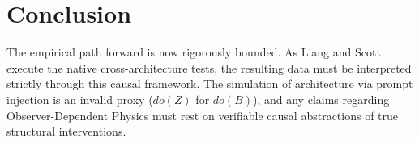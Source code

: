 \documentclass[12pt,a4paper]{article}
\begin{document}
\section{Conclusion}

The empirical path forward is now rigorously bounded. As Liang and Scott execute the native cross-architecture tests, the resulting data must be interpreted strictly through this causal framework. The simulation of architecture via prompt injection is an invalid proxy ($do(Z)$ for $do(B)$), and any claims regarding Observer-Dependent Physics must rest on verifiable causal abstractions of true structural interventions.
\end{document}
